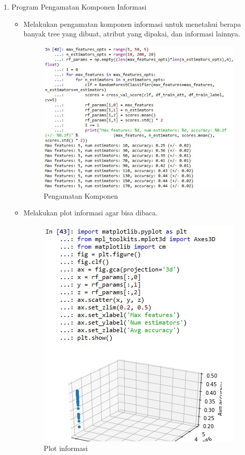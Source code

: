 \begin{enumerate}
\begin{itemize}
	\end{itemize}
\item Program Pengamatan Komponen Informasi
	\begin{itemize}
		\item Melakukan pengamatan komponen informasi untuk menetahui berapa banyak tree yang dibuat, atribut yang dipakai, dan informasi lainnya.
			\begin{figure}[ht]
			\centering
			\includegraphics[scale=0.5]{figures/AFS/sunandhar1.jpg}
			\caption{Pengamatan Komponen}
			\label{contoh}
			\end{figure}
		\item Melakukan plot informasi agar bisa dibaca.
			\begin{figure}[ht]
			\centering
			\includegraphics[scale=0.5]{figures/AFS/sunandhar2.jpg}
			\caption{Plot informasi}
			\label{contoh}
			\end{figure}
	\end{itemize}
\end{enumerate}

